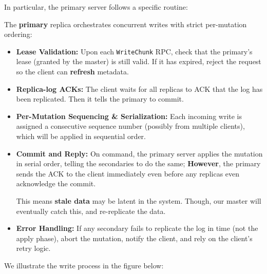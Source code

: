 \noindent
In particular, the primary server follows a specific routine:
\begin{Def}

  \label{def:primary}
  The \textbf{primary} replica orchestrates concurrent writes with strict per-mutation ordering:
  \begin{itemize}
    \item \textbf{Lease Validation:} Upon each \texttt{WriteChunk} RPC, check that the primary's lease (granted by the master) is still valid. If it has expired, reject the request so the client can \textbf{refresh} metadata.
    \item \textbf{Replica-log ACKs:} The client waits for all replicas to ACK that the log has been replicated. Then it tells the primary to commit.
    \item \textbf{Per-Mutation Sequencing \& Serialization:} Each incoming write is assigned a consecutive sequence number (possibly from multiple clients), which will be applied in sequential order.
    \item \textbf{Commit and Reply:} On command, the primary server applies the mutation in serial order, telling the secondaries to do the same; \textbf{However}, 
    the primary sends the ACK to the client immediately even before any replicas even acknowledge the commit.
    
    \quad This means \textbf{stale data} may be latent in the system. Though, our master will eventually catch this, and re-replicate the data.
    \item \textbf{Error Handling:} If any secondary fails to replicate the log in time (not the apply phase), abort the mutation, notify the client, and rely on the client's retry logic.
  \end{itemize}
\end{Def}

\newpage 
\noindent
We illustrate the write process in the figure below:


